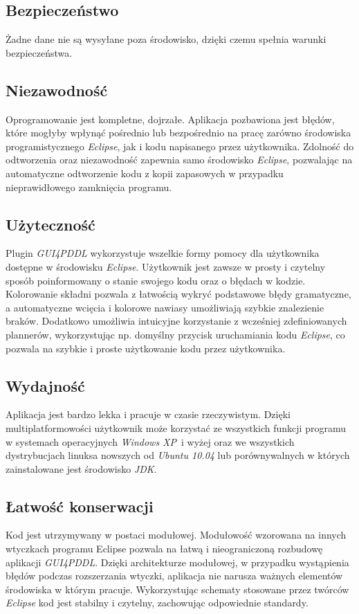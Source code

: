 \subsection*{Bezpieczeństwo}
Żadne dane nie są wysyłane poza środowisko, dzięki czemu spełnia warunki bezpieczeństwa.
\subsection*{Niezawodność}
Oprogramowanie jest kompletne, dojrzałe. Aplikacja pozbawiona jest błędów, które mogłyby wpłynąć pośrednio lub bezpośrednio na pracę zarówno środowiska programistycznego \emph{Eclipse}, jak i kodu napisanego przez użytkownika. Zdolność do odtworzenia oraz niezawodność zapewnia samo środowisko \emph{Eclipse}, pozwalając na automatyczne odtworzenie kodu z kopii zapasowych w przypadku nieprawidłowego zamknięcia programu.
\subsection*{Użyteczność}
Plugin \emph{GUI4PDDL} wykorzystuje wszelkie formy pomocy dla użytkownika dostępne w środowisku \emph{Eclipse}. Użytkownik jest zawsze w prosty i czytelny sposób poinformowany o stanie swojego kodu oraz o błędach w kodzie. Kolorowanie składni pozwala z łatwością wykryć podstawowe błędy gramatyczne, a automatyczne wcięcia i kolorowe nawiasy umożliwiają szybkie znalezienie braków. Dodatkowo umożliwia intuicyjne korzystanie z wcześniej zdefiniowanych plannerów, wykorzystując np. domyślny przycisk uruchamiania kodu \emph{Eclipse}, co pozwala na szybkie i proste użytkowanie kodu przez użytkownika.
\subsection*{Wydajność}
Aplikacja jest bardzo lekka i pracuje w czasie rzeczywistym. Dzięki multiplatformowości użytkownik może korzystać ze wszystkich funkcji programu w systemach operacyjnych \emph{Windows XP}\ i wyżej oraz we wszystkich dystrybucjach linuksa nowszych od \emph{Ubuntu 10.04} lub porównywalnych w których zainstalowane jest środowisko \emph{JDK}.
\subsection*{Łatwość konserwacji}
Kod jest utrzymywany w postaci modułowej. Modułowość wzorowana na innych wtyczkach programu Eclipse pozwala na łatwą i nieograniczoną rozbudowę aplikacji \emph{GUI4PDDL}. Dzięki architekturze modułowej, w przypadku wystąpienia błędów podczas rozszerzania wtyczki, aplikacja nie narusza ważnych elementów środowiska w którym pracuje. Wykorzystując schematy stosowane przez twórców \emph{Eclipse} kod jest stabilny i czytelny, zachowując odpowiednie standardy.


